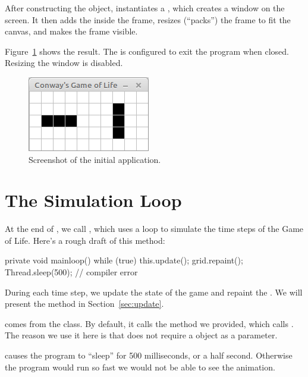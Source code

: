 After constructing the  object,  instantiates a , which creates a window on the screen.
It then adds the  inside the frame, resizes (``packs'') the frame to fit the canvas, and makes the frame visible.

Figure~\ref{fig:conway} shows the result.
The  is configured to exit the program when closed.
Resizing the window is disabled.

\begin{figure}[!ht]
\begin{center}
\includegraphics{figs/conway.png}
\caption{Screenshot of the initial  application.}
\label{fig:conway}
\end{center}
\end{figure}


\section{The Simulation Loop}
\label{mainloop}

At the end of , we call , which uses a  loop to simulate the time steps of the Game of Life.
Here's a rough draft of this method:

\begin{code}
private void mainloop() {
    while (true) {
        this.update();
        grid.repaint();
        Thread.sleep(500);    // compiler error
    }
}
\end{code}

During each time step, we update the state of the game and repaint the .
We will present the  method in Section~\ref{sec:update}.

 comes from the  class.
By default, it calls the  method we provided, which calls .
The reason we use it here is that  does not require a  object as a parameter.


 causes the program to ``sleep'' for 500 milliseconds, or a half second.
Otherwise the program would run so fast we would not be able to see the animation.

